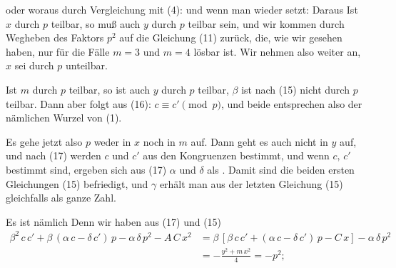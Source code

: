 oder
woraus durch Vergleichung mit (4):
und wenn man wieder
setzt:
Daraus
Ist $x$ durch $p$ teilbar, so muß auch $y$ durch $p$ teilbar sein, und wir kommen durch Wegheben des Faktors $p^2$ auf die Gleichung (11) zurück, die, wie wir gesehen haben, nur für die Fälle $m=3$ und $m=4$ lösbar ist. Wir nehmen also weiter an, $x$ sei durch $p$ unteilbar.

Ist $m$ durch $p$ teilbar, so ist auch $y$ durch $p$ teilbar, $\beta$ ist nach (15) nicht durch $p$ teilbar. Dann aber folgt aus (16): $c\equiv c' \pmod{p}$, und beide entsprechen also der nämlichen Wurzel von (1).

Es gehe jetzt also $p$ weder in $x$ noch in $m$ auf. Dann geht es auch nicht in $y$ auf, und nach (17) werden $c$ und $c'$ aus den Kongruenzen
bestimmt, und wenn $c,\,c'$ bestimmt sind, ergeben sich aus (17) $\alpha$ und $\delta$ als . Damit sind die beiden ersten Gleichungen (15) befriedigt, und $\gamma$ erhält man aus der letzten Gleichung (15) gleichfalls als ganze Zahl.

Es ist nämlich
Denn wir haben aus (17) und (15)
\[
\begin{aligned}
\beta^2\,c\,c'+\beta\,(\alpha\,c-\delta\,c')\,p-\alpha\,\delta\,p^2-A\,C\,x^2
&= \beta\,[\beta\,c\,c'+(\alpha\,c-\delta\,c')\,p-C\,x]-\alpha\,\delta\,p^2\\
&= -\frac{y^2+m\,x^2}{4} = -p^2;
\end{aligned}
\]
